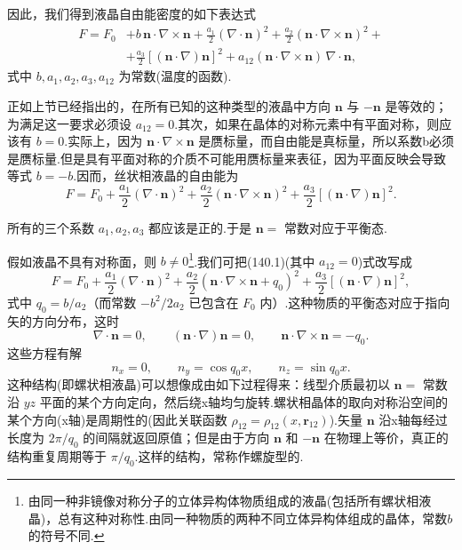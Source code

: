 因此，我们得到液晶自由能密度的如下表达式
\begin{equation}
\begin{aligned}
  F=F_0&+b\,\boldsymbol{n}\cdot\nabla\times\boldsymbol{n}
  +\frac{a_1}{2}(\nabla\cdot\boldsymbol{n})^2
  +\frac{a_2}{2}(\boldsymbol{n}\cdot\nabla\times\boldsymbol{n})^2+\\
  &+\frac{a_3}{2}\left[(\boldsymbol{n}\cdot\nabla)\boldsymbol{n}\right]^2
  +a_{12}(\boldsymbol{n}\cdot\nabla\times\boldsymbol{n})\,\nabla\cdot\boldsymbol{n},
\end{aligned}
\end{equation}
式中 $b,a_1,a_2,a_3,a_{12}$ 为常数(温度的函数).

正如上节已经指出的，在所有已知的这种类型的液晶中方向 $\boldsymbol{n}$ 与 $-\boldsymbol{n}$ 是等效的；为满足这一要求必须设 $a_{12}=0$.其次，如果在晶体的对称元素中有平面对称，则应该有 $b=0$.实际上，因为 $\boldsymbol{n}\cdot\nabla\times\boldsymbol{n}$ 是赝标量，而自由能是真标量，所以系数b必须是赝标量.但是具有平面对称的介质不可能用赝标量来表征，因为平面反映会导致等式 $b=-b$.因而，丝状相液晶的自由能为
\begin{equation}
  F=F_0+\frac{a_1}{2}(\nabla\cdot\boldsymbol{n})^2
  +\frac{a_2}{2}(\boldsymbol{n}\cdot\nabla\times\boldsymbol{n})^2
  +\frac{a_3}{2}\left[(\boldsymbol{n}\cdot\nabla)\boldsymbol{n}\right]^2.
\end{equation}

所有的三个系数 $a_1,a_2,a_3$ 都应该是正的.于是 $\boldsymbol{n}=$ 常数对应于平衡态.

假如液晶不具有对称面，则 $b\neq0$\footnote{由同一种非镜像对称分子的立体异构体物质组成的液晶(包括所有螺状相液晶)，总有这种对称性.由同一种物质的两种不同立体异构体组成的晶体，常数$b$的符号不同.}.我们可把(140.1)(其中 $a_{12}=0$)式改写成
\begin{equation}
  F=F_0+\frac{a_1}{2}(\nabla\cdot\boldsymbol{n})^2
  +\frac{a_2}{2}(\boldsymbol{n}\cdot\nabla\times\boldsymbol{n}+q_0)^2
  +\frac{a_3}{2}\left[(\boldsymbol{n}\cdot\nabla)\boldsymbol{n}\right]^2,
\end{equation}
式中 $q_0=b/a_2$（而常数 $-b^2/2a_2$ 已包含在 $F_0$ 内）.这种物质的平衡态对应于指向矢的方向分布，这时
\begin{equation*}
  \nabla\cdot\boldsymbol{n}=0,\qquad
  (\boldsymbol{n}\cdot\nabla)\boldsymbol{n}=0,\qquad
  \boldsymbol{n}\cdot\nabla\times\boldsymbol{n}=-q_0.
\end{equation*}
这些方程有解
\begin{equation}
  n_x=0,\qquad n_y=\cos q_0x,\qquad n_z=\sin q_0x.
\end{equation}
这种结构(即螺状相液晶)可以想像成由如下过程得来：线型介质最初以 $\boldsymbol{n}=$ 常数沿 $yz$ 平面的某个方向定向，然后绕x轴均匀旋转.螺状相晶体的取向对称沿空间的某个方向(x轴)是周期性的(因此关联函数 $\rho_{12}=\rho_{12}(x,\boldsymbol{r}_{12})$).矢量 $\boldsymbol{n}$ 沿x轴每经过长度为 $2\pi/q_0$ 的间隔就返回原值；但是由于方向 $\boldsymbol{n}$ 和 $-\boldsymbol{n}$ 在物理上等价，真正的结构重复周期等于 $\pi/q_0$.这样的结构，常称作螺旋型的.

